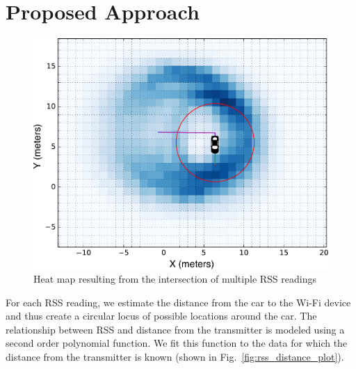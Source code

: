\documentclass{article}
\begin{document}
\section{Proposed Approach}
\vspace{-.3cm}
\begin{figure}
    \centering
    \vspace{-10pt}
    \includegraphics[width=\linewidth]{figures/moving_car.pdf}
    \caption{Heat map resulting from the intersection of multiple RSS readings \label{fig:moving_car}}
\end{figure}
For each RSS reading, we estimate the distance from the car to the Wi-Fi device and thus create a 
circular locus of possible locations around the car. The relationship between RSS and distance
from the transmitter is modeled using a second order polynomial function. We fit this function to the 
data for which the distance from the transmitter is known (shown in Fig.~\ref{fig:rss_distance_plot}).
\end{document}
